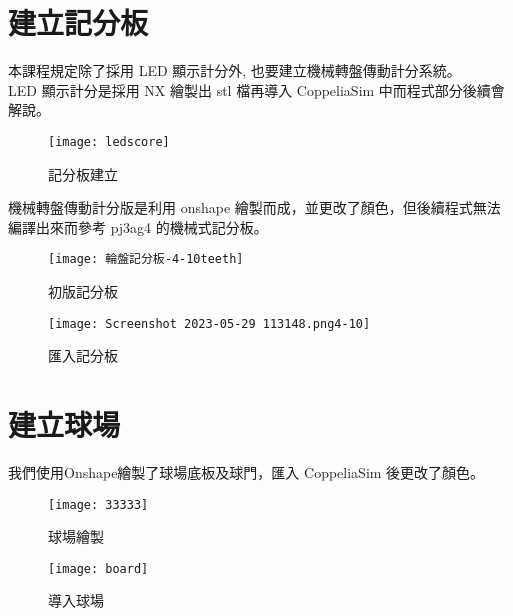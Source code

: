 \section{建立記分板}
本課程規定除了採用 LED 顯示計分外, 也要建立機械轉盤傳動計分系統。\\
LED 顯示計分是採用 NX 繪製出 stl 檔再導入 CoppeliaSim 中而程式部分後續會解說。\\
\begin{figure}[hbt!]
\begin{center}
\texttt{[image: ledscore]}
\caption{\Large 記分板建立}\label{記分板建立}
\end{center}
\end{figure}
機械轉盤傳動計分版是利用 onshape 繪製而成，並更改了顏色，但後續程式無法編譯出來而參考 pj3ag4 的機械式記分板。
\begin{figure}[hbt!]
\begin{center}
\texttt{[image: 輪盤記分板-4-10teeth]}
\caption{\Large 初版記分板}\label{初版記分板}
\end{center}
\end{figure}
\begin{figure}[hbt!]
\begin{center}
\texttt{[image: Screenshot 2023-05-29 113148.png4-10]}
\caption{\Large 匯入記分板}\label{匯入記分板}
\end{center}
\end{figure}
\newpage

\section{建立球場}
我們使用Onshape繪製了球場底板及球門，匯入 CoppeliaSim 後更改了顏色。\\
\begin{figure}[hbt!]
\begin{center}
\texttt{[image: 33333]}
\caption{\Large 球場繪製}\label{球場繪製}
\end{center}
\end{figure}
\begin{figure}[hbt!]
\begin{center}
\texttt{[image: board]}
\caption{\Large 導入球場}\label{導入球場}
\end{center}
\end{figure}\
\newpage

